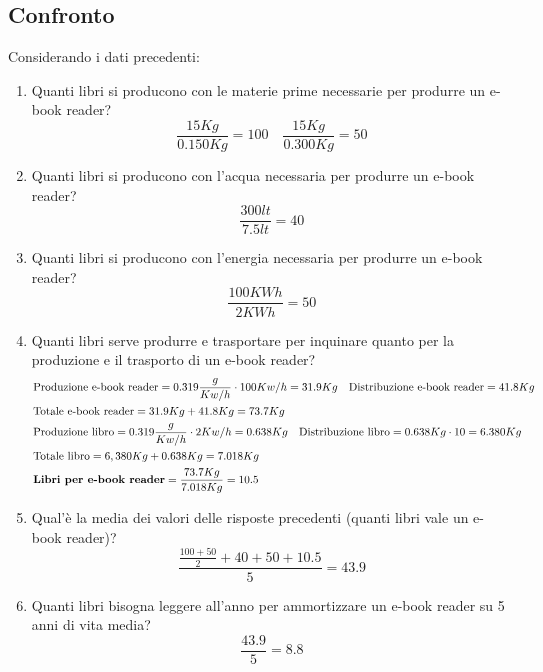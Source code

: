 \subsection{Confronto}
Considerando i dati precedenti:
\begin{enumerate}
	\item Quanti libri si producono con le materie prime necessarie per produrre un e-book reader?\\
	\begin{equation*}
		\frac{15Kg}{0.150Kg} = 100 \quad \frac{15Kg}{0.300Kg}=50
	\end{equation*}
	\item Quanti libri si producono con l'acqua necessaria per produrre un e-book reader?\\
	\begin{equation*}
		\frac{300lt}{7.5lt} = 40
	\end{equation*}
	\item Quanti libri si producono con l'energia necessaria per produrre un e-book reader?\\
	\begin{equation*}
		\frac{100KWh}{2KWh} = 50
	\end{equation*}
	\item Quanti libri serve produrre e trasportare per inquinare quanto per la produzione e il trasporto di un e-book reader?\\
	\begin{equation*}
		\begin{split}
			&\text{Produzione e-book reader}=0.319\frac{g}{Kw/h} \cdot 100Kw/h = 31.9Kg \quad \text{Distribuzione e-book reader}=41.8 Kg \\
			&\text{Totale e-book reader}=31.9Kg + 41.8Kg = 73.7 Kg \\
			&\text{Produzione libro}=0.319 \frac{g}{Kw/h} \cdot 2Kw/h = 0.638Kg \quad  \text{Distribuzione libro}= 0.638Kg \cdot 10 = 6.380Kg\\
			&\text{Totale libro}=6,380Kg + 0.638 Kg = 7.018Kg \\
			& \text{\textbf{Libri per e-book reader}}=\frac{73.7Kg}{7.018Kg}=10.5
		\end{split}
	\end{equation*}
	\item Qual'è la media dei valori delle risposte precedenti (quanti libri vale un e-book reader)?
	\begin{equation*}
		\frac{\frac{100+50}{2} + 40 + 50 + 10.5}{5} = 43.9
	\end{equation*}
	\item Quanti libri bisogna leggere all'anno per ammortizzare un e-book reader su 5 anni di vita media?
	\begin{equation*}
		\frac{43.9}{5} = 8.8
	\end{equation*}
\end{enumerate}

